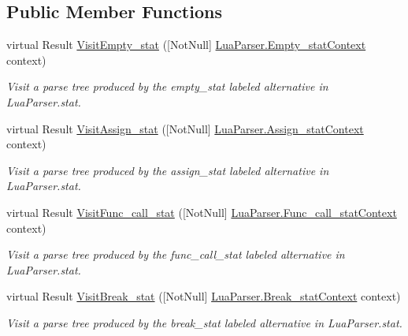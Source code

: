 \subsection*{Public Member Functions}
\begin{DoxyCompactItemize}
\item 
virtual Result \mbox{\hyperlink{classzlua_1_1_lua_base_visitor_af23710bf29c64a2976a48e6de8cae004}{Visit\+Empty\+\_\+stat}} (\mbox{[}Not\+Null\mbox{]} \mbox{\hyperlink{classzlua_1_1_lua_parser_1_1_empty__stat_context}{Lua\+Parser.\+Empty\+\_\+stat\+Context}} context)
\begin{DoxyCompactList}\small\item\em Visit a parse tree produced by the {\ttfamily empty\+\_\+stat} labeled alternative in Lua\+Parser.\+stat. \end{DoxyCompactList}\item 
virtual Result \mbox{\hyperlink{classzlua_1_1_lua_base_visitor_a803c8c7b10f83503634a866019163d28}{Visit\+Assign\+\_\+stat}} (\mbox{[}Not\+Null\mbox{]} \mbox{\hyperlink{classzlua_1_1_lua_parser_1_1_assign__stat_context}{Lua\+Parser.\+Assign\+\_\+stat\+Context}} context)
\begin{DoxyCompactList}\small\item\em Visit a parse tree produced by the {\ttfamily assign\+\_\+stat} labeled alternative in Lua\+Parser.\+stat. \end{DoxyCompactList}\item 
virtual Result \mbox{\hyperlink{classzlua_1_1_lua_base_visitor_ae4969a8795b22c20db3d5f1339484c47}{Visit\+Func\+\_\+call\+\_\+stat}} (\mbox{[}Not\+Null\mbox{]} \mbox{\hyperlink{classzlua_1_1_lua_parser_1_1_func__call__stat_context}{Lua\+Parser.\+Func\+\_\+call\+\_\+stat\+Context}} context)
\begin{DoxyCompactList}\small\item\em Visit a parse tree produced by the {\ttfamily func\+\_\+call\+\_\+stat} labeled alternative in Lua\+Parser.\+stat. \end{DoxyCompactList}\item 
virtual Result \mbox{\hyperlink{classzlua_1_1_lua_base_visitor_a0e906bc61ad12590e152305e36f80b27}{Visit\+Break\+\_\+stat}} (\mbox{[}Not\+Null\mbox{]} \mbox{\hyperlink{classzlua_1_1_lua_parser_1_1_break__stat_context}{Lua\+Parser.\+Break\+\_\+stat\+Context}} context)
\begin{DoxyCompactList}\small\item\em Visit a parse tree produced by the {\ttfamily break\+\_\+stat} labeled alternative in Lua\+Parser.\+stat. \end{DoxyCompactList}\item 

\end{DoxyCompactItemize}
